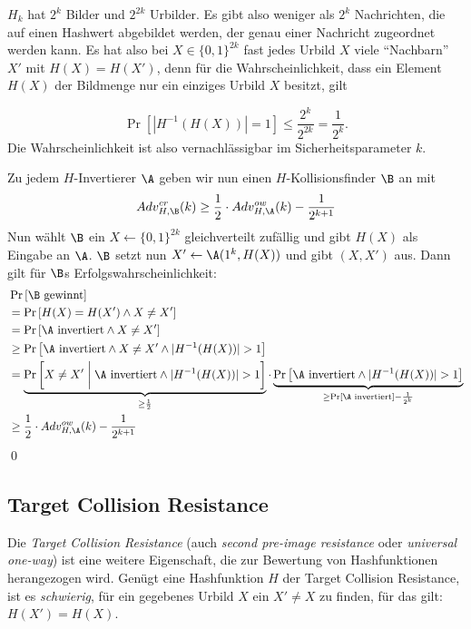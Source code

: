 \begin{beweisidee}
$H_k$ hat $2^k$ Bilder und $2^{2k}$ Urbilder. Es gibt also weniger als
$2^k$ Nachrichten, die auf einen Hashwert abgebildet werden, der genau einer
Nachricht zugeordnet werden kann. Es hat also bei $X \in \{0,1\}^{2k}$ fast jedes
Urbild $X$ viele "`Nachbarn"' $X'$ mit $H(X) = H(X')$, denn für die
Wahrscheinlichkeit, dass ein Element $H(X)$ der Bildmenge nur ein
einziges Urbild $X$ besitzt, gilt

\begin{equation*}
\Pr \left[ | H^{-1}(H(X))| = 1\right] \leq \frac{2^k}{2^{2k}} = \frac{1}{2^k}.
\end{equation*}
Die Wahrscheinlichkeit ist also vernachlässigbar im Sicherheitsparameter
$k$.
\end{beweisidee}

\begin{beweis}
Zu jedem $H$-Invertierer $\A$ geben wir nun einen $H$-Kollisionsfinder $\B$ an mit
\begin{equation*}
Adv^{cr}_{H,\B}(k) \geq \frac{1}{2} \cdot Adv^{ow}_{H,\A}(k) - \frac{1}{2^{k+1}}
\end{equation*} 
Nun wählt $\B$ ein $X \leftarrow \{0,1\}^{2k}$ gleichverteilt zufällig
und gibt $H(X)$ als Eingabe an $\A$. $\B$ setzt nun $X' \leftarrow
\A(1^k, H(X))$ und gibt $(X, X')$ aus. Dann gilt für $\B$s
Erfolgswahrscheinlichkeit:
\begin{align*}
	&\Pr \left[\B \text{ gewinnt}\right]\\
	&= \Pr\left[H(X) = H(X') \land X \not = X'\right]\\
	&= \Pr \left[\A \text{ invertiert} \land X \not = X'\right]\\
	&\geq \Pr \left[\A \text{ invertiert} \land X \not = X' \land \vert H^{-1}(H(X)) \vert > 1\right]\\
	&= \underbrace{\Pr \left[X \not = X' \biggm| \A \text{ invertiert} \land \vert H^{-1}(H(X)) \vert > 1\right]}_{\geq \frac{1}{2}}
	\cdot \underbrace{\Pr \left[\A \text{ invertiert} \land \vert H^{-1}(H(X)) \vert > 1\right]}_{\geq \Pr \left[\A \text{ invertiert}\right] - \frac{1}{2^k}}\\
	&\geq \frac{1}{2} \cdot Adv^{ow}_{H,\A}(k) - \frac{1}{2^{k+1}}
\end{align*}
\qed
\end{beweis}


\subsection{Target Collision Resistance}
Die \emph{Target Collision Resistance}\indexTargetCollisionResistance
(auch \emph{second pre-image resistance} oder \emph{universal one-way})
ist eine weitere Eigenschaft, die zur Bewertung von Hashfunktionen
herangezogen wird. Genügt eine Hashfunktion $H$ der Target Collision
Resistance, ist es \textit{schwierig}, für ein gegebenes Urbild $X$ ein
$X' \not = X$ zu finden, für das gilt: $H(X') = H(X)$.


